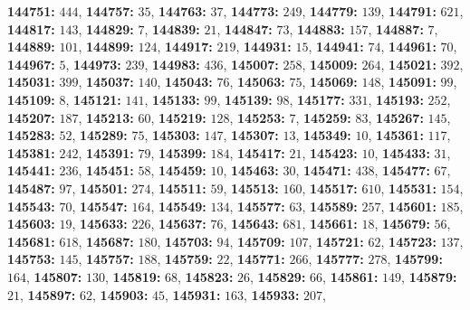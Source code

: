 \textsf{\bfseries 144751:} $444$, \textsf{\bfseries 144757:} $35$, \textsf{\bfseries 144763:} $37$, \textsf{\bfseries 144773:} $249$, \textsf{\bfseries 144779:} $139$, \textsf{\bfseries 144791:} $621$, \textsf{\bfseries 144817:} $143$, \textsf{\bfseries 144829:} $7$, \textsf{\bfseries 144839:} $21$, \textsf{\bfseries 144847:} $73$, \textsf{\bfseries 144883:} $157$, \textsf{\bfseries 144887:} $7$, \textsf{\bfseries 144889:} $101$, \textsf{\bfseries 144899:} $124$, \textsf{\bfseries 144917:} $219$, \textsf{\bfseries 144931:} $15$, \textsf{\bfseries 144941:} $74$, \textsf{\bfseries 144961:} $70$, \textsf{\bfseries 144967:} $5$, \textsf{\bfseries 144973:} $239$, \textsf{\bfseries 144983:} $436$, \textsf{\bfseries 145007:} $258$, \textsf{\bfseries 145009:} $264$, \textsf{\bfseries 145021:} $392$, \textsf{\bfseries 145031:} $399$, \textsf{\bfseries 145037:} $140$, \textsf{\bfseries 145043:} $76$, \textsf{\bfseries 145063:} $75$, \textsf{\bfseries 145069:} $148$, \textsf{\bfseries 145091:} $99$, \textsf{\bfseries 145109:} $8$, \textsf{\bfseries 145121:} $141$, \textsf{\bfseries 145133:} $99$, \textsf{\bfseries 145139:} $98$, \textsf{\bfseries 145177:} $331$, \textsf{\bfseries 145193:} $252$, \textsf{\bfseries 145207:} $187$, \textsf{\bfseries 145213:} $60$, \textsf{\bfseries 145219:} $128$, \textsf{\bfseries 145253:} $7$, \textsf{\bfseries 145259:} $83$, \textsf{\bfseries 145267:} $145$, \textsf{\bfseries 145283:} $52$, \textsf{\bfseries 145289:} $75$, \textsf{\bfseries 145303:} $147$, \textsf{\bfseries 145307:} $13$, \textsf{\bfseries 145349:} $10$, \textsf{\bfseries 145361:} $117$, \textsf{\bfseries 145381:} $242$, \textsf{\bfseries 145391:} $79$, \textsf{\bfseries 145399:} $184$, \textsf{\bfseries 145417:} $21$, \textsf{\bfseries 145423:} $10$, \textsf{\bfseries 145433:} $31$, \textsf{\bfseries 145441:} $236$, \textsf{\bfseries 145451:} $58$, \textsf{\bfseries 145459:} $10$, \textsf{\bfseries 145463:} $30$, \textsf{\bfseries 145471:} $438$, \textsf{\bfseries 145477:} $67$, \textsf{\bfseries 145487:} $97$, \textsf{\bfseries 145501:} $274$, \textsf{\bfseries 145511:} $59$, \textsf{\bfseries 145513:} $160$, \textsf{\bfseries 145517:} $610$, \textsf{\bfseries 145531:} $154$, \textsf{\bfseries 145543:} $70$, \textsf{\bfseries 145547:} $164$, \textsf{\bfseries 145549:} $134$, \textsf{\bfseries 145577:} $63$, \textsf{\bfseries 145589:} $257$, \textsf{\bfseries 145601:} $185$, \textsf{\bfseries 145603:} $19$, \textsf{\bfseries 145633:} $226$, \textsf{\bfseries 145637:} $76$, \textsf{\bfseries 145643:} $681$, \textsf{\bfseries 145661:} $18$, \textsf{\bfseries 145679:} $56$, \textsf{\bfseries 145681:} $618$, \textsf{\bfseries 145687:} $180$, \textsf{\bfseries 145703:} $94$, \textsf{\bfseries 145709:} $107$, \textsf{\bfseries 145721:} $62$, \textsf{\bfseries 145723:} $137$, \textsf{\bfseries 145753:} $145$, \textsf{\bfseries 145757:} $188$, \textsf{\bfseries 145759:} $22$, \textsf{\bfseries 145771:} $266$, \textsf{\bfseries 145777:} $278$, \textsf{\bfseries 145799:} $164$, \textsf{\bfseries 145807:} $130$, \textsf{\bfseries 145819:} $68$, \textsf{\bfseries 145823:} $26$, \textsf{\bfseries 145829:} $66$, \textsf{\bfseries 145861:} $149$, \textsf{\bfseries 145879:} $21$, \textsf{\bfseries 145897:} $62$, \textsf{\bfseries 145903:} $45$, \textsf{\bfseries 145931:} $163$, \textsf{\bfseries 145933:} $207$, 
